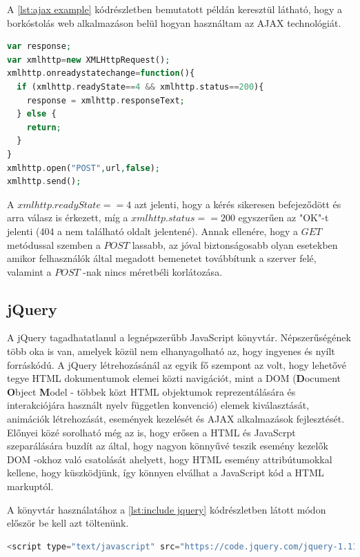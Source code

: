 \documentclass[12pt]{report}
\theoremstyle{definition}
\begin{document}
	A \ref{lst:ajax example} kódrészletben bemutatott példán keresztül látható, hogy a borkóstolás web alkalmazáson belül hogyan használtam az AJAX technológiát.
	
	\noindent\begin{minipage}{\linewidth}
		\begin{lstlisting}[language=php,label={lst:ajax example}, caption={AJAX példa kódrészlet}]
var response;
var xmlhttp=new XMLHttpRequest();
xmlhttp.onreadystatechange=function(){
  if (xmlhttp.readyState==4 && xmlhttp.status==200){
    response = xmlhttp.responseText;
  } else {
    return;
  }
}
xmlhttp.open("POST",url,false);
xmlhttp.send();
		\end{lstlisting}
	\end{minipage}
	
	A $xmlhttp.readyState==4$ azt jelenti, hogy a kérés sikeresen befejeződött és arra válasz is érkezett, míg a $xmlhttp.status==200$ egyszerűen az "OK"-t jelenti (404 a nem található oldalt jelentené). Annak ellenére, hogy a $GET$ metódussal szemben a $POST$ lassabb, az jóval biztonságosabb olyan esetekben amikor felhasználók által megadott bemenetet továbbítunk a szerver felé, valamint a $POST$ -nak nincs méretbéli korlátozása.
	
	\subsection{jQuery}
	A jQuery tagadhatatlanul a legnépszerűbb JavaScript könyvtár. Népszerűségének több oka is van, amelyek közül nem elhanyagolható az, hogy ingyenes és nyílt forráskódú. A jQuery létrehozásánál az egyik fő szempont az volt, hogy lehetővé tegye HTML dokumentumok elemei közti navigációt, mint a DOM (\textbf{D}ocument \textbf{O}bject \textbf{M}odel - többek közt HTML objektumok reprezentálására és interakciójára használt nyelv független konvenció) elemek kiválasztását, animációk létrehozását, események kezelését és AJAX alkalmazások fejlesztését. Előnyei közé sorolható még az is, hogy erősen a HTML és JavaScrpt szeparálására buzdít az által, hogy nagyon könnyűvé teszik esemény kezelők DOM -okhoz való csatolását ahelyett, hogy HTML esemény attribútumokkal kellene, hogy küszködjünk, így könnyen elválhat a JavaScript kód a HTML markuptól.
	
	A könyvtár használatához a \ref{lst:include jquery} kódrészletben látott módon először be kell azt töltenünk.
	
	\noindent\begin{minipage}{\linewidth}
		\begin{lstlisting}[language=php,label={lst:include jquery}, caption={jQuery betöltése}]
<script type="text/javascript" src="https://code.jquery.com/jquery-1.11.1.min.js"></script>
		\end{lstlisting}
	\end{minipage}
	
\end{document}
